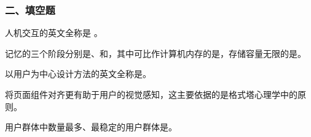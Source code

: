 \subsubsection*{二、填空题}
\setcounter{problemname}{0}

\begin{problem}
人机交互的英文全称是 。
\end{problem}


\begin{problem}
记忆的三个阶段分别是、和，其中可比作计算机内存的是，存储容量无限的是。
\end{problem}



\begin{problem}
以用户为中心设计方法的英文全称是。
\end{problem}



\begin{problem}
将页面组件对齐更有助于用户的视觉感知，这主要依据的是格式塔心理学中的原则。
\end{problem}



\begin{problem}
用户群体中数量最多、最稳定的用户群体是。
\end{problem}
